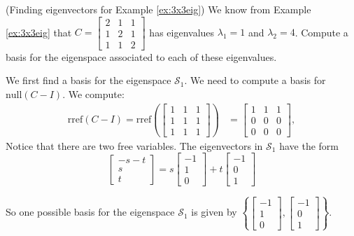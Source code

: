 \documentclass{ximera}
\begin{document}
\begin{example} (Finding eigenvectors for Example \ref{ex:3x3eig})
We know from Example \ref{ex:3x3eig} that $C=\begin{bmatrix} 2 & 1 & 1\\ 1 & 2 & 1\\ 1 & 1 & 2\end{bmatrix}$ has eigenvalues $\lambda_1=1$ and $\lambda_2=4$.  Compute a basis for the eigenspace associated to each of these eigenvalues.
\end{example}

\begin{explanation}
We first find a basis for the eigenspace $\mathcal{S}_1$.  We need to compute a basis for $\mbox{null}(C-I)$.  We compute:
\begin{align*}\mbox{rref}(C-I)=\mbox{rref}\left(\begin{bmatrix} 1 & 1 & 1\\ 1 & 1 & 1\\ 1 & 1 & 1\end{bmatrix}\right)&=\begin{bmatrix} 1 & 1 & 1\\ 0 & 0 & 0\\ 0 & 0 & 0\end{bmatrix},
\end{align*}
Notice that there are two free variables.  %
The eigenvectors in $\mathcal{S}_1$ have the form
$$\begin{bmatrix}-s-t\\s\\t\end{bmatrix} = s\begin{bmatrix}-1\\1\\0\end{bmatrix} + t\begin{bmatrix}-1\\0\\1\end{bmatrix}$$

So one possible basis for the eigenspace $\mathcal{S}_1$ is given by $\left\{\begin{bmatrix}-1\\1\\0\end{bmatrix}, \begin{bmatrix}-1\\0\\1\end{bmatrix}\right\}$.


\end{explanation}
\end{document}
